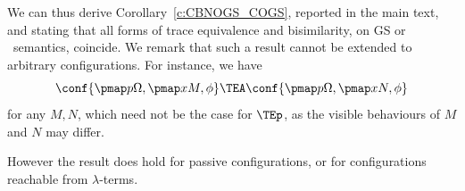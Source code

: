 

We can thus derive 
Corollary~\ref{c:CBNOGS_COGS}, reported in the main text, and  stating that all forms of
trace equivalence and bisimilarity, on GS or \piI\ semantics, coincide.   
%
We remark that such a  result  cannot be extended to arbitrary configurations.
For instance, 
we have 
\[ \conf {\pmap  p \Omega ,  \pmap  x M , \phi} 
\TEA
\conf {\pmap  p \Omega ,  \pmap  x N , \phi} 
\]
for any $M,N$, which need not be the case for 
$\TEp$, as the visible behaviours of $M$ and $N$ may differ. 


However the result does  hold for passive configurations, or for configurations reachable from
$\lambda$-terms.



\fi

